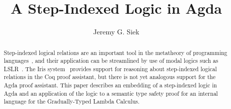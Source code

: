 \documentclass[acmsmall]{acmart}
\begin{document}
\title{A Step-Indexed Logic in Agda}

\author{Jeremy G. Siek}



\begin{abstract}
  Step-indexed logical relations are an important tool in the
  metatheory of programming
  languages~\citep{Appel:2001aa,Ahmed:2006aa}, and their application
  can be streamlined by use of modal logics such as
  LSLR~\citep{Dreyer:2011wl}.  The Iris system~\citep{JUNG:2018aa}
  provides support for reasoning about step-indexed logical relations
  in the Coq proof assistant, but there is not yet analogous support
  for the Agda proof assistant. This paper describes an embedding of
  a step-indexed logic in Agda and an application of the logic to a
  semantic type safety proof for an internal language for the
  Gradually-Typed Lambda Calculus.
\end{abstract}

\end{document}
